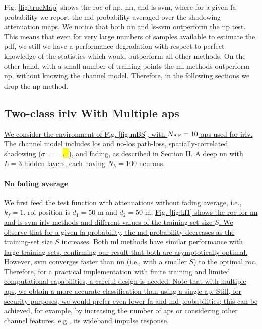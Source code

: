 \documentclass[draftcls,onecolumn,12pt]{IEEEtran}
\begin{document}
{Fig. \ref{fig:trueMap} shows the \ac{roc}  of \ac{np}, \ac{nn}, and \ac{ls}-\ac{svm}, where for a given \ac{fa} probability we report the  \ac{md} probability averaged over the shadowing attenuation maps. We notice that both \ac{nn} and \ac{ls}-\ac{svm} outperform the \ac{np} test. This means that even for very large numbers of samples available to estimate the \ac{pdf}, we still we have a performance degradation with respect to perfect knowledge of the statistics which would outperform all other methods. On the other hand, with a small number of training points the \ac{ml} methods outperform \ac{np}, without knowing the channel model. Therefore, in the following sections we drop the \ac{np} method.
 




\subsection{Two-class \ac{irlv} With Multiple \acp{ap}}
\label{sec:res_fading}

\uline{We consider the environment of Fig. \ref{fig:mBS}, with $N_{\rm AP}=10$ \acp{ap} used for \ac{irlv}. The channel model includes \ac{los} and no-\ac{los} path-loss, spatially-correlated shadowing ($\sigma... =$ \hl{...}), and fading, as described in Section II. A deep \ac{nn} with $L=3$ hidden layers, each having $N_h = 100$ neurons.}  

\paragraph{No fading average} We first feed the test function with attenuations without fading average, i.e., $k_f=1$.  \ac{roi} position is $d_1 = 50$ m and $d_2 = 50$ m. \uline{Fig. \ref{fig:kf1} shows the \ac{roc} for \ac{nn}  and \ac{ls}-\ac{svm} \ac{irlv} methods and different values of the training-set size $S$. We observe that for a given \ac{fa} probability, the \ac{md} probability decreases as the training-set size $S$ increases. Both \ac{ml} methods have similar  performance  with large  training sets, confirming our result that both are asymptotically optimal. However,  \ac{svm} converges faster than \ac{nn} (i.e., with a smaller $S$) to the optimal \ac{roc}. Therefore, for a practical implementation with finite training and limited computational capabilities, a careful design is needed. Note that with multiple \acp{ap}, we obtain a more accurate classification than using a single \ac{ap}. Still, for security purposes, we would prefer even lower  \ac{fa} and \ac{md} probabilities; this can be achieved, for example, by increasing the number of \acp{ap} or considering other channel features, e.g., its wideband impulse response. }

}
\end{document}
